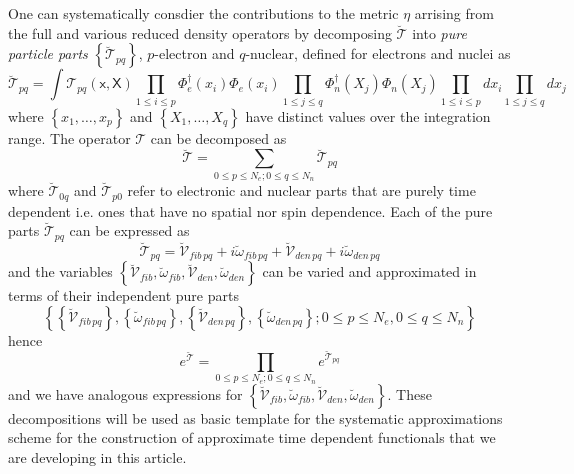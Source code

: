 \documentclass[aps,preprint]{revtex4}%
\begin{document}
One can systematically consdier the contributions to the metric $\eta$
arrising from the full and various reduced density operators by decomposing
$\mathcal{\breve{T}}$ into \textit{pure particle parts }$\left\{
\mathcal{\breve{T}}_{pq}\right\}  $, $p$-electron and $q$-nuclear, defined for
electrons and nuclei as%
\begin{equation}
\mathcal{\breve{T}}_{pq}=\int\mathcal{T}_{pq}\left(  \mathsf{x,X}\right)
\prod_{1\leq i\leq p}\Phi_{e}^{\dagger}(x_{i})\Phi_{e}(x_{i})\prod_{1\leq
j\leq q}\Phi_{n}^{\dagger}(X_{j})\Phi_{n}(X_{j})\prod_{1\leq i\leq p}%
dx_{i}\prod_{1\leq j\leq q}dx_{j}%
\end{equation}
where $\left\{  x_{1},\ldots,x_{p}\right\}  $ and $\left\{  X_{1},\ldots
,X_{q}\right\}  $ have distinct values over the integration range. The
operator $\mathcal{T}$ can be decomposed as
\begin{equation}
\mathcal{\breve{T}=}\sum_{0\leq p\leq N_{e};0\leq q\leq N_{n}}\mathcal{\breve
{T}}_{pq}%
\end{equation}
where $\mathcal{\breve{T}}_{0q}$ and $\mathcal{\breve{T}}_{p0}$ refer to
electronic and nuclear parts that are purely time dependent i.e. ones that
have no spatial nor spin dependence. Each of the pure parts $\mathcal{\breve
{T}}_{pq}$ can be expressed as
\begin{equation}
\mathcal{\breve{T}}_{pq}=\mathcal{\breve{V}}_{fib\,pq}+i\breve{\omega
}_{fib\,pq}+\mathcal{\breve{V}}_{den\,pq}+i\breve{\omega}_{den\,pq}%
\end{equation}
and the variables $\left\{  \mathcal{\breve{V}}_{fib},\breve{\omega}%
_{fib},\mathcal{\breve{V}}_{den},\breve{\omega}_{den}\right\}  $ can be varied
and approximated in terms of their independent pure parts
\begin{equation}
\left\{  \left\{  \mathcal{\breve{V}}_{fib\,pq}\right\}  ,\left\{
\breve{\omega}_{fib\,pq}\right\}  ,\left\{  \mathcal{\breve{V}}_{den\,pq}%
\right\}  ,\left\{  \breve{\omega}_{den\,pq}\right\}  ;0\leq p\leq N_{e},0\leq
q\leq N_{n}\right\}
\end{equation}
hence
\begin{equation}
e^{\mathcal{\breve{T}}}=\prod_{0\leq p\leq N_{e};0\leq q\leq N_{n}%
}e^{\mathcal{\breve{T}}_{pq}}%
\end{equation}
and we have analogous expressions for $\left\{  \mathcal{\breve{V}}%
_{fib},\breve{\omega}_{fib},\mathcal{\breve{V}}_{den},\breve{\omega}%
_{den}\right\}  $. These decompositions will be used as basic template for the
systematic approximations scheme for the construction of approximate time
dependent functionals that we are developing in this article.
\end{document}

